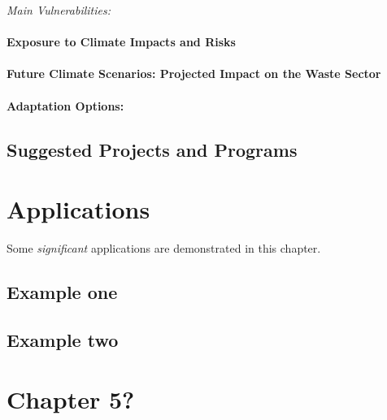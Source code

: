 \documentclass[
]{book}
\begin{document}
\emph{Main Vulnerabilities:}

\hypertarget{exposure-to-climate-impacts-and-risks-19}{%
\subsubsection{Exposure to Climate Impacts and Risks}\label{exposure-to-climate-impacts-and-risks-19}}

\hypertarget{future-climate-scenarios-projected-impact-on-the-waste-sector-1}{%
\subsubsection{Future Climate Scenarios: Projected Impact on the Waste Sector}\label{future-climate-scenarios-projected-impact-on-the-waste-sector-1}}

\hypertarget{adaptation-options-19}{%
\subsubsection{Adaptation Options:}\label{adaptation-options-19}}

\hypertarget{suggested-projects-and-programs-1}{%
\section{Suggested Projects and Programs}\label{suggested-projects-and-programs-1}}

\hypertarget{applications-1}{%
\chapter{Applications}\label{applications-1}}

Some \emph{significant} applications are demonstrated in this chapter.

\hypertarget{example-one-1}{%
\section{Example one}\label{example-one-1}}

\hypertarget{example-two-1}{%
\section{Example two}\label{example-two-1}}

\hypertarget{chapter-5-1}{%
\chapter{Chapter 5?}\label{chapter-5-1}}

  
\end{document}
